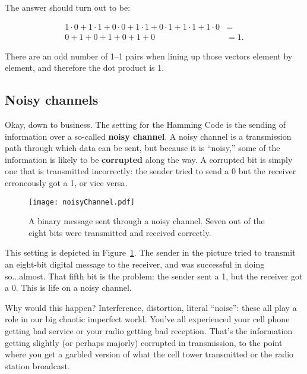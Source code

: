 \begin{alttitles}
The answer should turn out to be:

\vspace{-.15in}
\begin{align*}
1\cdot 0 + 
1\cdot 1 + 
0\cdot 0 + 
1\cdot 1 + 
0\cdot 1 + 
1\cdot 1 + 
1\cdot 0 &= \\
0 + 
1 + 
0 + 
1 + 
0 + 
1 + 
0 &= 1.
\end{align*}
\vspace{-.15in}

There are an odd number of 1--1 pairs when lining up those vectors element by
element, and therefore the dot product is 1.

\subsection{Noisy channels}


Okay, down to business. The setting for the Hamming Code is the sending of
information over a so-called \textbf{noisy channel}. A noisy channel is a
transmission path through which data can be sent, but because it is ``noisy,''
some of the information is likely to be \textbf{corrupted} along the way. A
corrupted bit is simply one that is transmitted incorrectly: the sender tried
to send a 0 but the receiver erroneously got a 1, or vice versa.

\begin{figure}[ht]
\centering
\texttt{[image: noisyChannel.pdf]}
\caption{A binary message sent through a noisy channel. Seven out of the eight
bits were transmitted and received correctly.}
\label{fig:noisyChannel}
\end{figure}

This setting is depicted in Figure~\ref{fig:noisyChannel}. The sender in the
picture tried to transmit an eight-bit digital message to the receiver, and was
successful in doing so...almost. That fifth bit is the problem: the sender sent
a 1, but the receiver got a 0. This is life on a noisy channel.

Why would this happen? Interference, distortion, literal ``noise'': these all
play a role in our big chaotic imperfect world. You've all experienced your
cell phone getting bad service or your radio getting bad reception. That's the
information getting slightly (or perhaps majorly) corrupted in transmission, to
the point where you get a garbled version of what the cell tower transmitted or
the radio station broadcast.


\end{alttitles}
